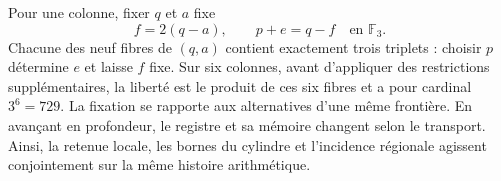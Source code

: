 Pour une colonne, fixer \(q\) et \(a\) fixe
\[
f=2(q-a),\qquad p+e=q-f\quad\text{en }\mathbb F_3.
\]
Chacune des neuf fibres de \((q,a)\) contient exactement trois triplets : choisir \(p\) détermine \(e\) et laisse \(f\) fixe. Sur six colonnes, avant d'appliquer des restrictions supplémentaires, la liberté est le produit de ces six fibres et a pour cardinal \(3^6=729\). La fixation se rapporte aux alternatives d'une même frontière. En avançant en profondeur, le registre et sa mémoire changent selon le transport. Ainsi, la retenue locale, les bornes du cylindre et l'incidence régionale agissent conjointement sur la même histoire arithmétique.
